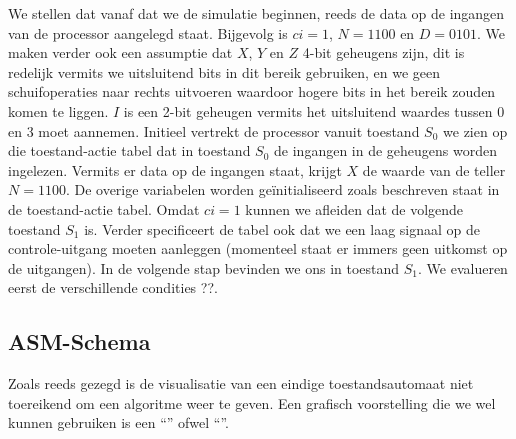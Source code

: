 We stellen dat vanaf dat we de simulatie beginnen, reeds de data op de ingangen van de processor aangelegd staat. Bijgevolg is $ci=1$, $N=1100$ en $D=0101$. We maken verder ook een assumptie dat $X$, $Y$ en $Z$ 4-bit geheugens zijn, dit is redelijk vermits we uitsluitend bits in dit bereik gebruiken, en we geen schuifoperaties naar rechts uitvoeren waardoor hogere bits in het bereik zouden komen te liggen. $I$ is een 2-bit geheugen vermits het uitsluitend waardes tussen 0 en 3 moet aannemen. Initieel vertrekt de processor vanuit toestand $S_0$ we zien op die toestand-actie tabel dat in toestand $S_0$ de ingangen in de geheugens worden ingelezen. Vermits er data op de ingangen staat, krijgt $X$ de waarde van de teller $N=1100$. De overige variabelen worden ge\"initialiseerd zoals beschreven staat in de toestand-actie tabel. Omdat $ci=1$ kunnen we afleiden dat de volgende toestand $S_1$ is. Verder specificeert de tabel ook dat we een laag signaal op de controle-uitgang moeten aanleggen (momenteel staat
er immers geen uitkomst op de uitgangen). In de volgende stap bevinden we ons in toestand $S_1$. We evalueren eerst de verschillende condities ??.
\subsection{ASM-Schema}
Zoals reeds gezegd is de visualisatie van een eindige toestandsautomaat niet toereikend om een algoritme weer te geven. Een grafisch voorstelling die we wel kunnen gebruiken is een ``'' ofwel ``''.
